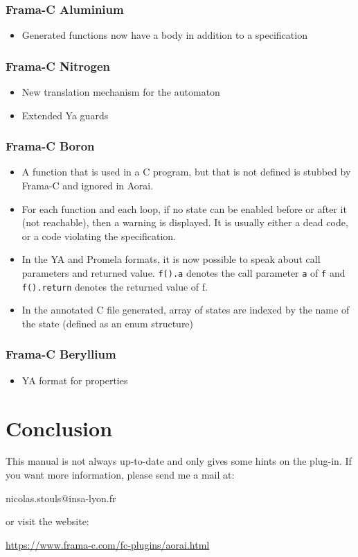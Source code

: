 \documentclass{frama-c-book}
\begin{document}
\subsection{Frama-C Aluminium}
\begin{itemize}
\item Generated functions now have a body in addition to a specification
\end{itemize}
\subsection{Frama-C Nitrogen}
\begin{itemize}
\item New translation mechanism for the automaton
\item Extended Ya guards
\end{itemize}

\subsection{Frama-C Boron}
\lstset{language=ya}
\begin{itemize}
\item A function that is used in a C program, but that is not defined
  is stubbed by Frama-C and ignored in Aorai.
\item For each function and each loop, if no state can be enabled
  before or after it (not reachable), then a warning is displayed. It
  is usually either a dead code, or a code violating the
  specification.
\item In the YA and Promela formats, it is now possible to speak about
  call parameters and returned value. \lstinline|f().a| denotes the call
  parameter \lstinline|a| of \lstinline|f| and
  \lstinline|f().return| denotes the returned value of f.
\item In the annotated C file generated, array of states are indexed
  by the name of the state (defined as an enum structure)
\end{itemize}

\subsection{Frama-C Beryllium}
\begin{itemize}
  \item YA format for properties
\end{itemize}


\chapter{Conclusion}
This manual is not always up-to-date and only gives some hints on the \aorai
plug-in. If you want more information, please send me a mail at:

\begin{center}
  nicolas.stouls@insa-lyon.fr
\end{center}

or visit the website:

\begin{center}
  \url{https://www.frama-c.com/fc-plugins/aorai.html}
\end{center}
\end{document}
